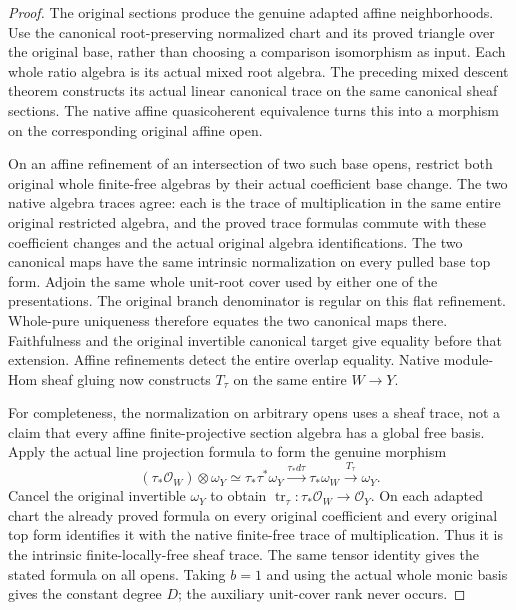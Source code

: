 \begin{proof}
The original sections produce the genuine adapted affine neighborhoods.
Use the canonical root-preserving normalized chart and its proved
triangle over the original base, rather than choosing a comparison
isomorphism as input.  Each whole ratio algebra is its actual mixed
root algebra.  The preceding mixed descent theorem constructs its
actual linear canonical trace on the same canonical sheaf sections.
The native affine quasicoherent equivalence turns this into a morphism
on the corresponding original affine open.

On an affine refinement of an intersection of two such base opens,
restrict both original whole finite-free algebras by their actual
coefficient base change.  The two native algebra traces agree: each is
the trace of multiplication in the same entire original restricted
algebra, and the proved trace formulas commute with these coefficient
changes and the actual original algebra identifications.  The two
canonical maps have the same intrinsic normalization on every pulled
base top form.  Adjoin the same whole unit-root cover used by either
one of the presentations.  The original branch denominator is regular
on this flat refinement.  Whole-pure uniqueness therefore equates the
two canonical maps there.  Faithfulness and the original invertible
canonical target give equality before that extension.  Affine
refinements detect the entire overlap equality.  Native module-Hom
sheaf gluing now constructs $T_\tau$ on the same entire $W\to Y$.

For completeness, the normalization on arbitrary opens uses a sheaf
trace, not a claim that every affine finite-projective section algebra
has a global free basis.  Apply the actual line projection formula to
form the genuine morphism
\[
 (\tau_*\mathcal O_W)\otimes\omega_Y
 \simeq\tau_*\tau^*\omega_Y\xrightarrow{\tau_*d\tau}
 \tau_*\omega_W\xrightarrow{T_\tau}\omega_Y.
\]
Cancel the original invertible $\omega_Y$ to obtain
$\operatorname{tr}_\tau:\tau_*\mathcal O_W\to\mathcal O_Y$.
On each adapted chart the already proved formula on every original
coefficient and every original top form identifies it with the native
finite-free trace of multiplication.  Thus it is the intrinsic
finite-locally-free sheaf trace.  The same tensor identity gives the
stated formula on all opens.  Taking $b=1$ and using the actual whole
monic basis gives the constant degree $D$; the auxiliary unit-cover
rank never occurs.
\end{proof}
